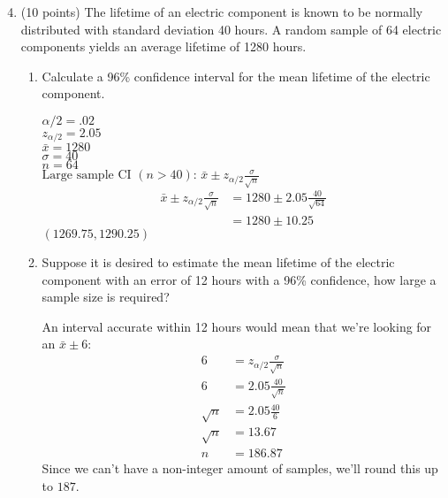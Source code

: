 \documentclass[12pt, letter]{article}
\newenvironment{nscenter}
	{\parskip=0pt\par\nopagebreak\centering}
	{\par\noindent\ignorespacesafterend}
\begin{document}
\begin{enumerate}
	\setcounter{enumi}{3}
	\item (10 points) The lifetime of an electric component is known to be normally distributed with standard deviation 40 hours. A random sample of 64 electric components yields an average lifetime of 1280 hours.
	\begin{enumerate}
		\item Calculate a 96\% confidence interval for the mean lifetime of the electric component.
		\begin{nscenter}
			$\alpha/2 = .02$ \\
			$z_{\alpha/2} = 2.05$ \\
			$\bar{x} = 1280$ \\
			$\sigma = 40$ \\
			$n = 64$ \\
			$\text{Large sample CI $(n > 40)$: } \bar{x} \pm z_{\alpha/2}\frac{\sigma}{\sqrt{n}}$
			\begin{align*}
				\bar{x} \pm z_{\alpha/2}\frac{\sigma}{\sqrt{n}} &= 1280 \pm 2.05\frac{40}{\sqrt{64}} \\
				&= 1280 \pm 10.25
			\end{align*}
			$\boxed{(1269.75, 1290.25)}$
		\end{nscenter}		
		
		\pagebreak
		
		\item Suppose it is desired to estimate the mean lifetime of the electric component with an error of 12 hours with a 96\% confidence, how large a sample size is required?
		\begin{center}
			An interval accurate within 12 hours would mean that we're looking for an $\bar{x} \pm 6$:
			\begin{align*}
				6 &= z_{\alpha/2}\frac{\sigma}{\sqrt{n}} \\
				6 &= 2.05 \frac{40}{\sqrt{n}} \\
				\sqrt{n} &= 2.05 \frac{40}{6} \\
				\sqrt{n} &= 13.67 \\
				n &= 186.87
			\end{align*}
			Since we can't have a non-integer amount of samples, we'll round this up to $\boxed{187}$.
		\end{center}
	\end{enumerate}
	

\end{enumerate}
\end{document}
